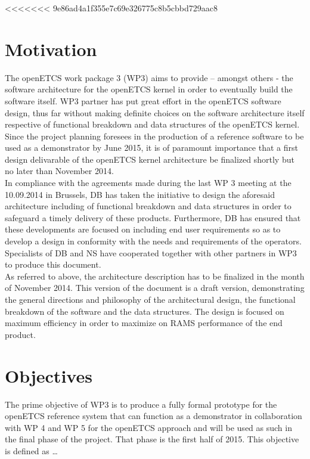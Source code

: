 <<<<<<< 9e86ad4a1f355e7c69e326775c8b5cbbd729aac8
%

\section{Motivation}
The openETCS work package 3 (WP3) aims to provide – amongst others - the software architecture for the openETCS kernel in order to eventually build the software itself. WP3  partner has put great effort in the openETCS software design, thus far without making definite choices on the software architecture itself respective of functional breakdown and data structures of the openETCS kernel. Since the project planning foresees in the production of a reference software to be used as a demonstrator by June 2015, it is of paramount importance that a first design delivarable of the openETCS kernel architecture be finalized shortly but no later than November 2014.\\

In compliance with the agreements made during the last WP 3 meeting at the 10.09.2014 in Brussels, DB has taken the initiative to design the aforesaid architecture including of functional breakdown and data structures in order to safeguard a timely delivery of these products. Furthermore, DB has ensured that these developments are focused on including end user requirements so as to develop a design in conformity with the needs and requirements of the operators. Specialists of DB and NS have cooperated together with other partners in WP3 to produce this document.\\

As referred to above, the architecture description has to be finalized in the month of November 2014. This version of the document is a draft version, demonstrating the general directions and philosophy of the architectural design, the functional breakdown of the software and the data structures. The design is focused on maximum efficiency in order to maximize on RAMS performance of the end product.\\


\section{Objectives}
The prime objective of WP3 is to produce a fully formal prototype for the openETCS reference system that can function as a demonstrator in collaboration with WP 4 and WP 5  for the openETCS approach and will be used as such in the final phase of the project. That phase is the first half of 2015.  This objective is defined as … 

